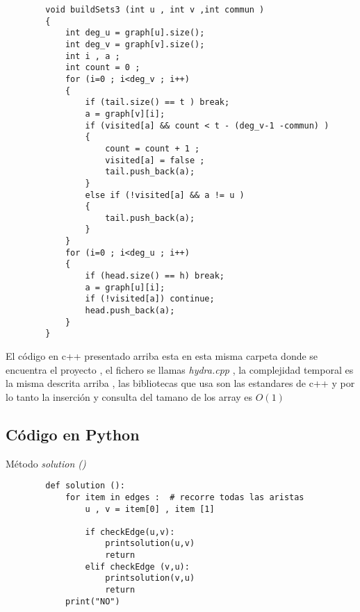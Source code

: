 \documentclass[12pt]{article}
\begin{document}
    \begin{verbatim}
        void buildSets3 (int u , int v ,int commun ) 
        {
            int deg_u = graph[u].size();   
            int deg_v = graph[v].size();   
            int i , a ; 
            int count = 0 ; 
            for (i=0 ; i<deg_v ; i++)
            {
                if (tail.size() == t ) break; 
                a = graph[v][i]; 
                if (visited[a] && count < t - (deg_v-1 -commun) ) 
                {
                    count = count + 1 ; 
                    visited[a] = false ; 
                    tail.push_back(a);
                }
                else if (!visited[a] && a != u ) 
                {
                    tail.push_back(a);
                }
            }
            for (i=0 ; i<deg_u ; i++)
            {
                if (head.size() == h) break; 
                a = graph[u][i];
                if (!visited[a]) continue;  
                head.push_back(a);
            }
        }
    \end{verbatim}

    

    \noindent El c\'odigo en c++ presentado arriba esta en esta misma carpeta donde se encuentra el proyecto , el fichero se llamas \textit{hydra.cpp} , la complejidad temporal es la misma descrita arriba , las bibliotecas que usa son las estandares de c++ y por lo tanto la inserci\'on  y consulta del tamano de los array es $O\left(1\right)$
    
    \subsection{C\'odigo en Python} 

    \noindent M\'etodo \textit{solution ()} 
    
    \begin{verbatim}
        def solution ():
            for item in edges :  # recorre todas las aristas 
                u , v = item[0] , item [1]

                if checkEdge(u,v):
                    printsolution(u,v)
                    return 
                elif checkEdge (v,u):
                    printsolution(v,u)
                    return 
            print("NO")
    \end{verbatim}
\end{document}
